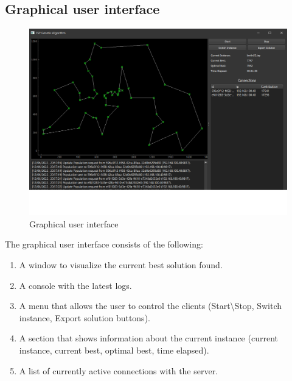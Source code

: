 \subsection{Graphical user interface}
\begin{figure}[ht]
\includegraphics[width=\textwidth]{images/gui.png}
\caption{Graphical user interface}
\end{figure}
\noindent
The graphical user interface consists of the following:
\begin{enumerate}
  \item A window to visualize the current best solution found.
  \item A console with the latest logs.
  \item A menu that allows the user to control the clients (Start\textbackslash Stop, Switch instance, Export solution buttons).
  \item A section that shows information about the current instance (current instance, current best, optimal best, time elapsed).
  \item A list of currently active connections with the server.
\end{enumerate}
\clearpage
